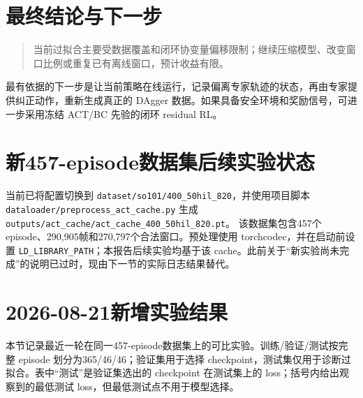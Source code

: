 \documentclass[UTF8,a4paper,11pt,fontset=none]{ctexart}
\begin{document}
\section{最终结论与下一步}
\begin{quote}\colorbox{bluegray}{\parbox{0.92\textwidth}{当前过拟合主要受数据覆盖和闭环协变量偏移限制；继续压缩模型、改变窗口比例或重复已有离线窗口，预计收益有限。}}
\end{quote}
最有依据的下一步是让当前策略在线运行，记录偏离专家轨迹的状态，再由专家提供纠正动作，重新生成真正的 DAgger 数据。如果具备安全环境和奖励信号，可进一步采用冻结 ACT/BC 先验的闭环 residual RL。

\section{新457-episode数据集后续实验状态}
当前已将配置切换到 \texttt{dataset/so101/400\_50hil\_820}，并使用项目脚本
\texttt{dataloader/preprocess\_act\_cache.py} 生成
\texttt{outputs/act\_cache/act\_cache\_400\_50hil\_820.pt}。
该数据集包含457个 episode、290,905帧和270,797个合法窗口。预处理使用 torchcodec，并在启动前设置
\texttt{LD\_LIBRARY\_PATH}；本报告后续实验均基于该 cache。此前关于“新实验尚未完成”的说明已过时，现由下一节的实际日志结果替代。

\section{2026-08-21新增实验结果}
本节记录最近一轮在同一457-episode数据集上的可比实验。训练/验证/测试按完整 episode 划分为365/46/46；验证集用于选择 checkpoint，测试集仅用于诊断过拟合。表中“测试”是验证集选出的 checkpoint 在测试集上的 loss；括号内给出观察到的最低测试 loss，但最低测试点不用于模型选择。
\end{document}
